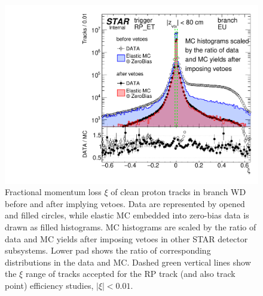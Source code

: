 \begin{figure}%
	\centering
	\parbox{0.4725\textwidth}{%
		\centering%
		\includegraphics[width=\linewidth,page=4]{graphics/systematicsEfficiency/RpSyst/xiPerBranch.pdf}%
	} 
	\quad
	\parbox{0.4725\textwidth}{ 
		\centering\vspace{67pt}
			\caption[Fractional momentum loss $\xi$ of clean proton tracks before and after implying vetoes in the data and MC (branch WD).]%
			{Fractional momentum loss $\xi$ of clean proton tracks in branch WD before and after implying vetoes. Data are represented by opened and filled circles, while elastic MC embedded into zero-bias data is drawn as filled histograms. MC histograms are scaled by the ratio of data and MC yields after imposing vetoes in other STAR detector subsystems. Lower pad shows the ratio of corresponding distributions in the data and MC. Dashed green vertical lines show the $\xi$ range of tracks accepted for the RP track (and also track point) efficiency studies, $|\xi|<0.01$.}\label{fig:rpSystXi_WD}%
	}
	
\end{figure}


























